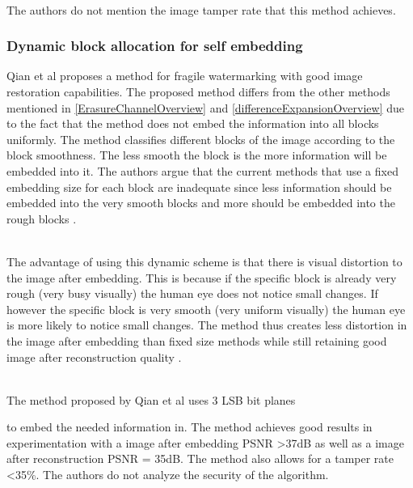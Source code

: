 \documentclass[12pt]{article}
\begin{document}
\hspace{0pt} \\ 
The authors do not mention the image tamper rate that this method \cite {tian2003high} achieves.

\subsubsection{Dynamic block allocation for self embedding}
\label{DynamicBlockOverview}
Qian et al \cite{qian2011image} proposes a method for fragile watermarking with good image restoration capabilities.
The proposed method differs from the other methods mentioned in \ref{ErasureChannelOverview} and \ref{differenceExpansionOverview} due to the fact that the method does not embed the information into all blocks uniformly.
The method classifies different blocks of the image according to the block smoothness.
The less smooth the block is the more information will be embedded into it.
The authors argue that the current methods that use a fixed embedding size for each block are inadequate since less information should be embedded into the very smooth blocks and more should be embedded into the rough blocks \cite{qian2011image}.

\hspace{0pt} \\
The advantage of using this dynamic scheme is that there is visual distortion to the image after embedding. 
This is because if the specific block is already very rough (very busy visually) the human eye does not notice small changes.
If however the specific block is very smooth (very uniform visually) the human eye is more likely to notice small changes.
The method thus creates less distortion in the image after embedding than fixed size methods while still retaining good image after reconstruction quality \cite{qian2011image}. 

\hspace{0pt} \\
The method proposed by Qian et al \cite{qian2011image} uses 3 LSB bit planes

to embed the needed information in.
The method achieves good results in experimentation with a image after embedding PSNR \textgreater 37dB as well as a image after reconstruction PSNR = 35dB.
The method also allows for a tamper rate \textless 35\%.
The authors do not analyze the security of the algorithm.
\end{document}
